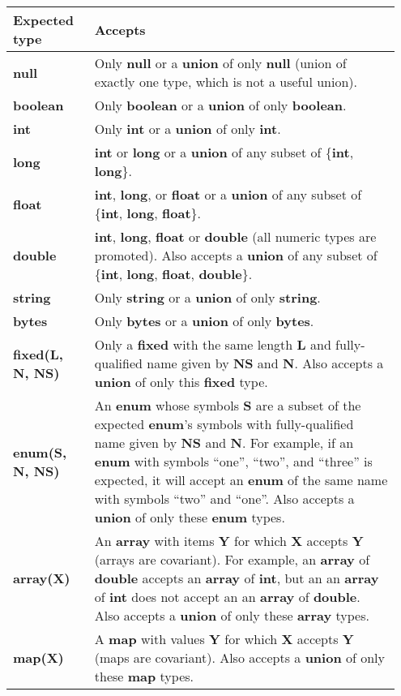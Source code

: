\documentclass{article}
\newcommand{\PFAc}{\ttfamily\bfseries}
\newcommand{\PFAtp}{\ttfamily\bfseries}
\theoremstyle{definition}
\begin{document}
\noindent\begin{longtable}{p{0.2\linewidth} p{0.75\linewidth}}
{\bf Expected type} & {\bf Accepts} \\\hline\endhead
{\bf null} & Only {\bf null} or a {\bf union} of only {\bf null} (union of exactly one type, which is not a useful union). \\
{\bf boolean} & Only {\bf boolean} or a {\bf union} of only {\bf boolean}. \\
{\bf int} & Only {\bf int} or a {\bf union} of only {\bf int}. \\
{\bf long} & {\bf int} or {\bf long} or a {\bf union} of any subset of \{{\bf int}, {\bf long}\}. \\
{\bf float} & {\bf int}, {\bf long}, or {\bf float} or a {\bf union} of any subset of \{{\bf int}, {\bf long}, {\bf float}\}. \\
{\bf double} & {\bf int}, {\bf long}, {\bf float} or {\bf double} (all numeric types are promoted).  Also accepts a {\bf union} of any subset of \{{\bf int}, {\bf long}, {\bf float}, {\bf double}\}. \\
{\bf string} & Only {\bf string} or a {\bf union} of only {\bf string}. \\
{\bf bytes} & Only {\bf bytes} or a {\bf union} of only {\bf bytes}. \\
{\bf fixed({\PFAtp L}, {\PFAtp N}, {\PFAtp NS})} & Only a {\bf fixed} with the same length {\PFAtp L} and fully-qualified name given by {\PFAtp NS} and {\PFAtp N}.  Also accepts a {\bf union} of only this {\bf fixed} type. \\
{\bf enum({\PFAtp S}, {\PFAtp N}, {\PFAtp NS})} & An {\bf enum} whose symbols {\PFAc S} are a subset of the expected {\bf enum}'s symbols with fully-qualified name given by {\PFAtp NS} and {\PFAtp N}.  For example, if an {\bf enum} with symbols ``one'', ``two'', and ``three'' is expected, it will accept an {\bf enum} of the same name with symbols ``two'' and ``one''.  Also accepts a {\bf union} of only these {\bf enum} types. \\
{\bf array({\PFAtp X})} & An {\bf array} with items {\PFAc Y} for which {\PFAc X} accepts {\PFAc Y} (arrays are covariant).  For example, an {\bf array} of {\bf double} accepts an {\bf array} of {\bf int}, but an an {\bf array} of {\bf int} does not accept an an {\bf array} of {\bf double}.  Also accepts a {\bf union} of only these {\bf array} types. \\
{\bf map({\PFAtp X})} & A {\bf map} with values {\PFAc Y} for which {\PFAc X} accepts {\PFAc Y} (maps are covariant).  Also accepts a {\bf union} of only these {\bf map} types. \\

\end{longtable}
\end{document}
